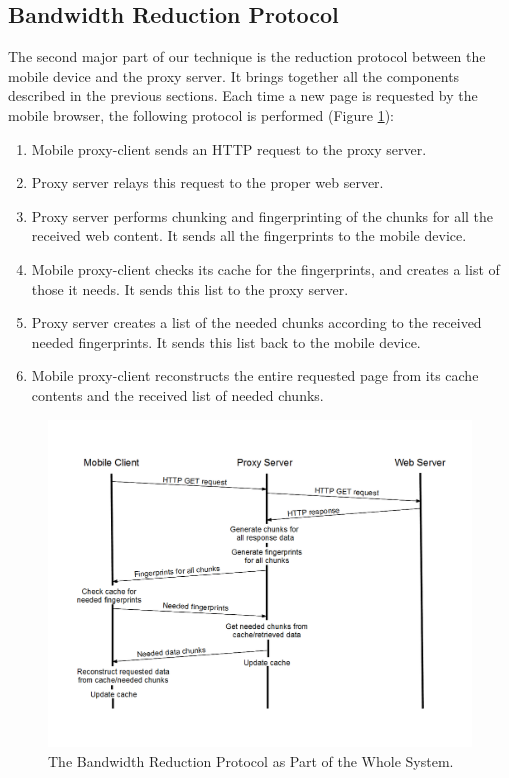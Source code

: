 \subsection{Bandwidth Reduction Protocol}
\label{sec:protocol}
The second major part of our technique is the reduction protocol between the mobile device and the proxy server. It brings together all the components described in the previous sections. Each time a new page is requested by the mobile browser, the following protocol is performed (Figure \ref{fig:protocol}):

\begin{enumerate}
\item Mobile proxy-client sends an HTTP request to the proxy server.
\item Proxy server relays this request to the proper web server.
\item Proxy server performs chunking and fingerprinting of the chunks for all the received web content. It sends all the fingerprints to the mobile device.
\item Mobile proxy-client checks its cache for the fingerprints, and creates a list of those it needs. It sends this list to the proxy server.
\item Proxy server creates a list of the needed chunks according to the received needed fingerprints. It sends this list back to the mobile device.
\item Mobile proxy-client reconstructs the entire requested page from its cache contents and the received list of needed chunks.
\end{enumerate}

\begin{figure}[h] 
\centering \includegraphics[scale=0.70]{images/protocol_diagram.png}
\caption{The Bandwidth Reduction Protocol as Part of the Whole System.}
\label{fig:protocol}
\end{figure}

